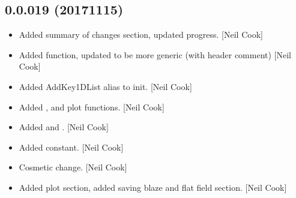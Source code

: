 \documentclass[a4paper,10pt,english]{report}
\begin{document}
\subsection{0.0.019 (2017\sphinxhyphen{}11\sphinxhyphen{}15)}
\label{\detokenize{misc/changelog:id551}}\begin{itemize}
\item {} 
Added  summary of changes section, updated progress. {[}Neil
Cook{]}

\item {} 
Added  function, updated  to be more
generic (with header comment) {[}Neil Cook{]}

\item {} 
Added AddKey1DList alias to init. {[}Neil Cook{]}

\item {} 
Added ,
 and  plot
functions. {[}Neil Cook{]}

\item {} 
Added  and . {[}Neil Cook{]}

\item {} 
Added  constant. {[}Neil Cook{]}

\item {} 
Cosmetic change. {[}Neil Cook{]}

\item {} 
Added plot section, added saving blaze and flat field section. {[}Neil
Cook{]}

\end{itemize}
\end{document}
